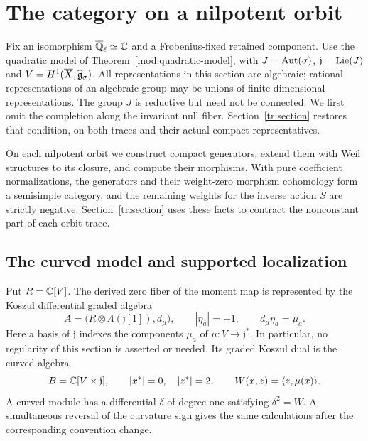 \section{The category on a nilpotent orbit}\label{orb:section}

Fix an isomorphism $\overline{\mathbb Q}_{\ell}\simeq\mathbb C$ and a Frobenius-fixed retained
component.  Use the quadratic model of Theorem~\ref{mod:quadratic-model},
with $J=\operatorname{Aut}(\sigma)$, $\mathfrak j=\operatorname{Lie}(J)$ and
$V=H^1(\overline X,\widehat{\mathfrak g}_\sigma)$.  All representations in this section
are algebraic; rational representations of an algebraic group may be
unions of finite-dimensional representations.  The group $J$ is reductive
but need not be connected.  We first omit the completion along the
invariant null fiber.  Section~\ref{tr:section} restores that condition,
on both traces and their actual compact representatives.

On each nilpotent orbit we construct compact generators, extend them
with Weil structures to its closure, and compute their morphisms. With
pure coefficient normalizations, the generators and their weight-zero
morphism cohomology form a semisimple category, and the remaining weights for the
inverse action $S$ are strictly negative. Section~\ref{tr:section} uses
these facts to contract the nonconstant part of each orbit trace.

\subsection{The curved model and supported localization}

Put $R=\mathbb C[V]$.  The derived zero fiber of the moment map is represented
by the Koszul differential graded algebra
\begin{equation}\label{orb:derived-koszul}
 A=\bigl(R\otimes\Lambda(\mathfrak j[1]),d_\mu\bigr),
 \qquad |\eta_a|=-1,\qquad d_\mu\eta_a=\mu_a.
\end{equation}
Here a basis of $\mathfrak j$ indexes the components $\mu_a$ of
$\mu:V\to\mathfrak j^*$.  In particular, no regularity of this section
is asserted or needed.  Its graded Koszul dual is the curved algebra
\begin{equation}\label{orb:potential}
 B=\mathbb C[V\times\mathfrak j],\qquad
 |x^*|=0,\quad |z^*|=2,\qquad
 W(x,z)=\langle z,\mu(x)\rangle.
\end{equation}
A curved module has a differential $\delta$ of degree one satisfying
$\delta^2=W$.  A simultaneous reversal of the curvature sign gives the
same calculations after the corresponding convention change.

